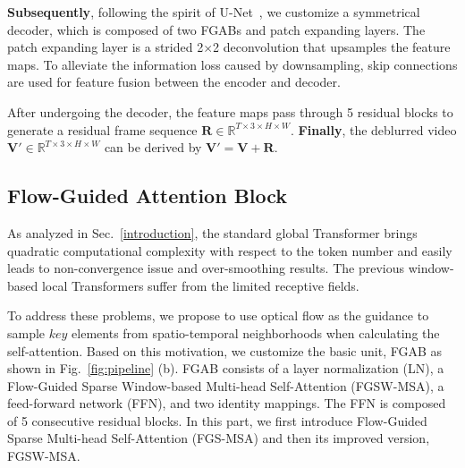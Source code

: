 \documentclass{article}
\begin{document}
	\textbf{Subsequently}, following the spirit of U-Net~\cite{unet}, we customize a symmetrical decoder, which is composed of two FGABs and patch expanding layers. The patch expanding layer is a strided 2$\times$2 deconvolution that upsamples the feature maps. To alleviate the information loss caused by downsampling, skip connections are used for feature fusion between the encoder and decoder.
	
	After undergoing the decoder, the feature maps pass through 5 residual blocks to generate a residual frame sequence $\mathbf{R}\in \mathbb{R}^{T\times 3\times H \times W}$. \textbf{Finally}, the deblurred video $\mathbf{V'}\in \mathbb{R}^{T\times 3\times H \times W}$ can be derived by $\mathbf{V'} = \mathbf{V} + \mathbf{R}$.
	
	\vspace{-1.5mm}
	\subsection{Flow-Guided Attention Block}
	\vspace{-1mm}
As analyzed in Sec.~\ref{introduction}, the standard global Transformer brings quadratic computational complexity with respect to the token number and easily leads to non-convergence issue and over-smoothing results. The previous window-based local Transformers suffer from the limited receptive fields. 
	
	To address these problems, we propose to use optical flow as the guidance to sample $key$ elements from spatio-temporal neighborhoods when calculating the self-attention. Based on this motivation, we customize the basic unit, FGAB as shown in Fig.~\ref{fig:pipeline} (b). FGAB consists of a layer normalization (LN), a Flow-Guided Sparse Window-based Multi-head Self-Attention (FGSW-MSA), a feed-forward network (FFN), and two identity mappings. The FFN is composed of 5 consecutive residual blocks. In this part, we first introduce Flow-Guided Sparse Multi-head Self-Attention (FGS-MSA) and then its improved version, FGSW-MSA.
	
\end{document}
